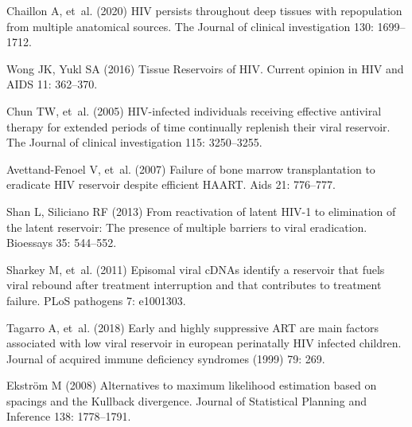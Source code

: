 \documentclass[11pt]{article}
\begin{document}
{\begin{thebibliography}{10}
Chaillon A, et~al. (2020) {{HIV}} persists throughout deep tissues with
  repopulation from multiple anatomical sources.
\newblock The Journal of clinical investigation 130: 1699--1712.

Wong JK, Yukl SA (2016) Tissue {{Reservoirs}} of {{HIV}}.
\newblock Current opinion in HIV and AIDS 11: 362--370.

Chun TW, et~al. (2005) {{HIV}}-infected individuals receiving effective
  antiviral therapy for extended periods of time continually replenish their
  viral reservoir.
\newblock The Journal of clinical investigation 115: 3250--3255.

{Avettand-Fenoel} V, et~al. (2007) Failure of bone marrow transplantation to
  eradicate {{HIV}} reservoir despite efficient {{HAART}}.
\newblock Aids 21: 776--777.

Shan L, Siliciano RF (2013) From reactivation of latent {{HIV}}-1 to
  elimination of the latent reservoir: The presence of multiple barriers to
  viral eradication.
\newblock Bioessays 35: 544--552.

Sharkey M, et~al. (2011) Episomal viral {{cDNAs}} identify a reservoir that
  fuels viral rebound after treatment interruption and that contributes to
  treatment failure.
\newblock PLoS pathogens 7: e1001303.

Tagarro A, et~al. (2018) Early and highly suppressive {{ART}} are main factors
  associated with low viral reservoir in european perinatally {{HIV}} infected
  children.
\newblock Journal of acquired immune deficiency syndromes (1999) 79: 269.

Ekstr{\"o}m M (2008) Alternatives to maximum likelihood estimation based on
  spacings and the {{Kullback}} divergence.
\newblock Journal of Statistical Planning and Inference 138: 1778--1791.


\end{thebibliography}}
\end{document}
